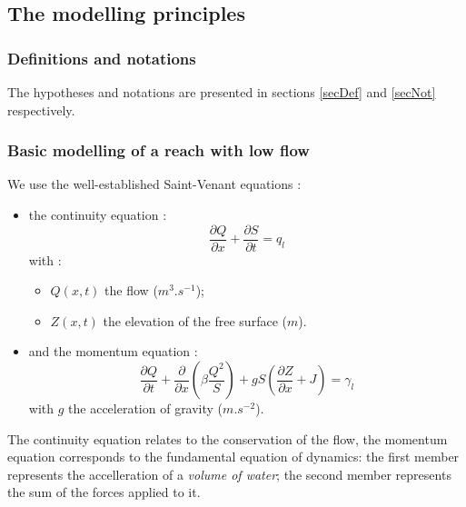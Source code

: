 \subsection{The modelling principles}

\subsubsection{Definitions and notations}

The hypotheses and notations are presented in sections \ref{secDef} and \ref{secNot} respectively.

\subsubsection{Basic modelling of a reach with low flow}

We use the well-established Saint-Venant equations :

\begin{itemize}
 \item the continuity equation :
   \begin{equation}
     \label{masse}
     \frac{\partial Q}{\partial x} + \frac{\partial S}{\partial t}= q_l
   \end{equation}
   with :
   \begin{itemize}
     \item $Q(x,t)$ the flow ($m^3.s^{-1}$);
     \item $Z(x,t)$ the elevation of the free surface ($m$).
   \end{itemize}

  \vspace{0.5cm}

 \item and the momentum equation :
   \begin{equation}
     \label{qmv}
     \frac{\partial Q}{\partial t} + \frac{\partial}{\partial x}\left( {\beta \frac{Q^2}{S}} \right) + g S \left( \frac{\partial Z}{\partial x} + J \right) = \gamma_l
   \end{equation}
   with $g$ the acceleration of gravity ($m.s^{-2}$).

\end{itemize}

\vspace{0.5cm}

The continuity equation relates to the conservation of the flow, the momentum equation corresponds to the fundamental equation of dynamics: the first member represents the accelleration of a \textit{volume of water}; the second member represents the sum of the forces applied to it.

